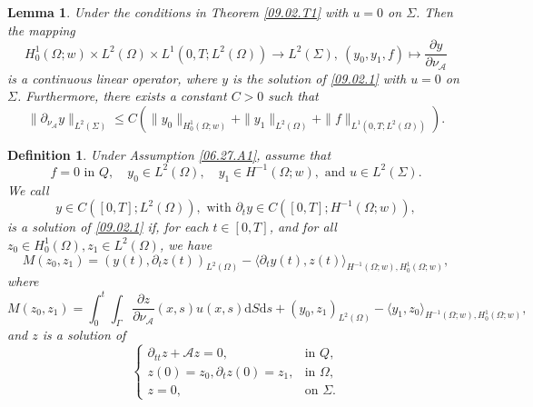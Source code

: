 \documentclass[10pt,a4paper]{amsart}
\newtheorem{lemma}{Lemma}
\newtheorem{definition}{Definition}
\def\Ga{\Gamma}
\def\Om{\Omega}
\def\df{\mathrm d}
\def\f{\frac}
\def\lg{\langle}
\def\mcA{\mathcal{A}}
\def\pt{\partial}
\def\ra{\rightarrow}
\def\rg{\rangle}
\def\ts{\times}
\begin{document}
\begin{lemma}\label{09.04.L3}
	Under the conditions in Theorem \ref{09.02.T1} with $u=0$ on $\Sigma$. Then the mapping 
	\begin{equation*}
		H_0^1(\Om;w)\ts L^2(\Om)\ts L^1(0,T; L^2(\Om))\ra L^2(\Sigma), \ (y_0,y_1,f)\mapsto \f{\pt y}{\pt\nu_\mcA}
	\end{equation*}
	is a continuous linear operator, where $y$ is the solution of \eqref{09.02.1} with $u=0$ on $\Sigma$. Furthermore, there exists a constant $C>0$ such that 
	\begin{equation}\label{09.04.6}
		\|\pt_{\nu_\mcA} y\|_{L^2(\Sigma)}\leq C \left(\|y_0\|_{H_0^1(\Om;w)}+\|y_1\|_{L^2(\Om)}+\|f\|_{L^1(0,T; L^2(\Om))}\right).
	\end{equation}
\end{lemma}

\begin{definition}\label{09.04.D1}
	Under Assumption \ref{06.27.A1}, assume that 
	\begin{equation*}
		f=0 \mbox{ in }Q, \quad y_0\in L^2(\Om), \quad y_1\in H^{-1}(\Om;w), \mbox{ and } u\in L^2(\Sigma). 
	\end{equation*}
	We call 
	\begin{equation*}
		y\in C([0,T]; L^2(\Om)), \mbox{ with } \pt_ty \in C([0,T]; H^{-1}(\Om;w)), 
	\end{equation*} 
	is a solution of \eqref{09.02.1}  if,  for each $t\in [0,T]$, and for all  $z_0\in H_0^1(\Om),z_1\in L^2(\Om)$, we have 
	\begin{equation}\label{09.12.1}
		M(z_0,z_1)=(y(t), \pt_t z(t))_{L^2(\Om)}-\lg \pt_ty(t), z(t)\rg_{H^{-1}(\Om;w), H_0^1(\Om;w)}, 
	\end{equation}
	where 
	\begin{equation*}
		M(z_0,z_1)=\int_0^t\int_\Ga  \f{\pt z}{\pt \nu_\mcA}(x,s) u(x,s)\df S\df s+(y_0, z_1)_{L^2(\Om)}-\lg y_1, z_0\rg_{H^{-1}(\Om;w), H_0^1(\Om;w)}, 
	\end{equation*}
	and $z$ is a solution of 
	\begin{equation*}
		\begin{cases}
			\pt_{tt}z+\mcA z=0, &\mbox{in }Q,\\
			z(0)=z_0, \pt_tz(0)=z_1, &\mbox{in }\Om,\\
			z=0, &\mbox{on }\Sigma. 
		\end{cases}
	\end{equation*} 
\end{definition}
\end{document}
